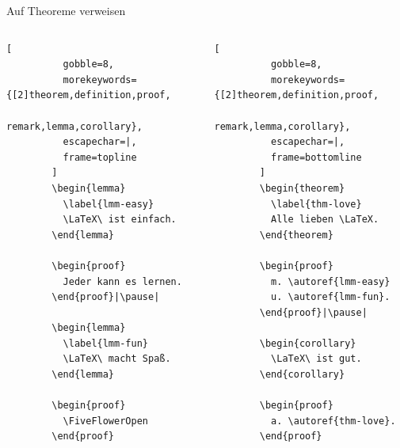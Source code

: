 \begin{Frame}[fragile]{Auf Theoreme verweisen}
  \begin{columns}
      \begin{lstlisting}[
          gobble=8,
          morekeywords={[2]theorem,definition,proof,
            remark,lemma,corollary},
          escapechar=|,
          frame=topline
        ]
        \begin{lemma}
          \label{lmm-easy}
          \LaTeX\ ist einfach.
        \end{lemma}

        \begin{proof}
          Jeder kann es lernen.
        \end{proof}|\pause|
        
        \begin{lemma}
          \label{lmm-fun}
          \LaTeX\ macht Spaß.
        \end{lemma}

        \begin{proof}
          \FiveFlowerOpen
        \end{proof}
      \end{lstlisting}

    \pause
      \begin{lstlisting}[
          gobble=8,
          morekeywords={[2]theorem,definition,proof,
            remark,lemma,corollary},
          escapechar=|,
          frame=bottomline
        ]
        \begin{theorem}
          \label{thm-love}
          Alle lieben \LaTeX.
        \end{theorem}

        \begin{proof}
          m. \autoref{lmm-easy}
          u. \autoref{lmm-fun}.
        \end{proof}|\pause|
        
        \begin{corollary}
          \LaTeX\ ist gut.
        \end{corollary}

        \begin{proof}
          a. \autoref{thm-love}.
        \end{proof}
      \end{lstlisting}
  \end{columns}
\end{Frame}

